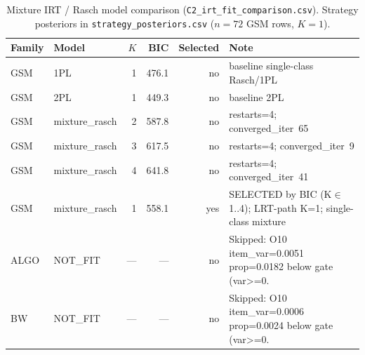 \begin{table}[t]
\centering
\scriptsize
\caption{Mixture IRT / Rasch model comparison
(\texttt{C2\_irt\_fit\_comparison.csv}). Strategy posteriors in
\texttt{strategy\_posteriors.csv} ($n{=}72$ GSM rows, $K{=}1$).}
\label{tab:c2-irt}
\begin{tabular}{llrrrl}
\toprule
Family & Model & $K$ & BIC & Selected & Note \\
\midrule
GSM & 1PL & 1 & 476.1 & no & baseline single-class Rasch/1PL \\
GSM & 2PL & 1 & 449.3 & no & baseline 2PL \\
GSM & mixture\_rasch & 2 & 587.8 & no & restarts=4; converged\_iter~65 \\
GSM & mixture\_rasch & 3 & 617.5 & no & restarts=4; converged\_iter~9 \\
GSM & mixture\_rasch & 4 & 641.8 & no & restarts=4; converged\_iter~41 \\
GSM & mixture\_rasch & 1 & 558.1 & yes & SELECTED by BIC (K$\in$1..4); LRT-path K=1; single-class mixture \\
ALGO & NOT\_FIT & --- & --- & no & Skipped: O10 item\_var=0.0051 prop=0.0182 below gate (var>=0. \\
BW & NOT\_FIT & --- & --- & no & Skipped: O10 item\_var=0.0006 prop=0.0024 below gate (var>=0. \\
\bottomrule
\end{tabular}
\end{table}
